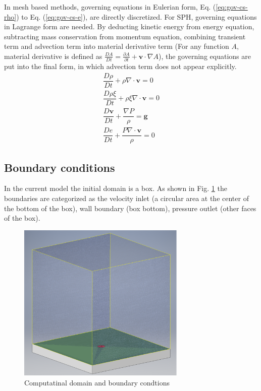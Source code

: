 In mesh based methods, governing equations in Eulerian form, Eq. (\ref{eq:gov-cs-rho}) to Eq. (\ref{eq:gov-cs-e}), are directly discretized. For SPH, governing equations in Lagrange form are needed. By deducting kinetic energy from energy equation, subtracting mass conservation from momentum equation, combining transient term and advection term into material derivative term (For any function $A$, material derivative is defined as $\frac{D A}{Dt} = \frac{\partial A}{\partial t} + \textbf{v} \cdot \nabla A$), the governing equations are put into the final form, in which advection term does not appear explicitly.
\begin{align}
\dfrac{D \rho}{D t} + \rho \nabla \cdot \textbf{v} = 0 \label{eq:gov-nc-rho}\\
\dfrac{D \rho \xi}{D t} + \rho \xi \nabla \cdot \textbf{v} = 0 \label{eq:gov-nc-ks}\\
\dfrac{D \textbf{v}}{D t} + \dfrac{\nabla P}{\rho} =\textbf{g} \label{eq:gov-nc-v}\\
\dfrac{D e}{D t} + \dfrac{P \nabla \cdot \textbf{v}}{\rho} = 0 \label{eq:gov-nc-e}
\end{align}

\subsection{Boundary conditions}
In the current model the initial domain is a box. As shown in Fig. \ref{fig:domain-BCs} the boundaries are categorized as the velocity inlet (a circular area at the center of the bottom of the box), wall boundary (box bottom), pressure outlet (other faces of the box).
\begin{figure}
\center
\includegraphics[width=8cm]{Chapter-2/Figures/Domain_good}
\caption{Computatinal domain and boundary condtions}
\label{fig:domain-BCs}
\end{figure}

